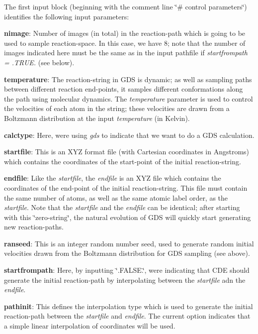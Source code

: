 The first input block (beginning with the comment line \char`\"{}\# control parameters\char`\"{}) identifies the following input parameters\+:
\begin{DoxyItemize}
\item {\bfseries nimage}\+: Number of images (in total) in the reaction-\/path which is going to be used to sample reaction-\/space. In this case, we have 8; note that the number of images indicated here must be the same as in the input pathfile if {\itshape startfrompath = .T\+R\+UE.} (see below).
\item {\bfseries temperature}\+: The reaction-\/string in G\+DS is dynamic; as well as sampling paths between different reaction end-\/points, it samples different conformations along the path using molecular dynamics. The {\itshape temperature} parameter is used to control the velocities of each atom in the string; these velocities are drawn from a Boltzmann distribution at the input {\itshape temperature} (in Kelvin).
\item {\bfseries calctype}\+: Here, we\textquotesingle{}re using {\itshape gds} to indicate that we want to do a G\+DS calculation.
\item {\bfseries startfile}\+: This is an X\+YZ format file (with Cartesian coordinates in Angstroms) which contains the coordinates of the start-\/point of the initial reaction-\/string.
\item {\bfseries endfile}\+: Like the {\itshape startfile}, the {\itshape endfile} is an X\+YZ file which contains the coordinates of the end-\/point of the initial reaction-\/string. This file must contain the same number of atoms, as well as the same atomic label order, as the {\itshape startfile}. Note that the {\itshape startfile} and the {\itshape endfile} can be identical; after starting with this \char`\"{}zero-\/string\char`\"{}, the natural evolution of G\+DS will quickly start generating new reaction-\/paths.
\item {\bfseries ranseed}\+: This is an integer random number seed, used to generate random initial velocities drawn from the Boltzmann distribution for G\+DS sampling (see above).
\item {\bfseries startfrompath}\+: Here, by inputting \char`\"{}.\+F\+A\+L\+S\+E.\char`\"{}, we\textquotesingle{}re indicating that C\+DE should generate the initial reaction-\/path by interpolating between the {\itshape startfile} adn the {\itshape endfile}.
\item {\bfseries pathinit}\+: This defines the interpolation type which is used to generate the initial reaction-\/path between the {\itshape startfile} and {\itshape endfile}. The current option indicates that a simple linear interpolation of coordinates will be used.
\end{DoxyItemize}

